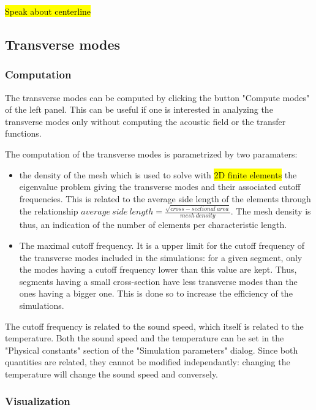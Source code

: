 \documentclass[]{article}
\begin{document}
	\hl{Speak about centerline}
	
	\subsection{Transverse modes}
	
	\subsubsection{Computation}
	
	The transverse modes can be computed by clicking the button
	"Compute modes" of the left panel. This can be useful if one is interested in analyzing the transverse modes only without 
	computing the acoustic field or the transfer functions.
	
	The computation of the transverse modes is parametrized by two 
	paramaters: 
	\begin{itemize}
		\item the density of the mesh which is used to solve with 
		\hl{2D finite elements} the 
		eigenvalue problem giving the transverse modes and their 
		associated cutoff frequencies. This is related to the average
		side length of the elements through the relationship
		$average~side~length = \frac{\sqrt{cross-sectional~area}}{mesh~density}$. 
		The mesh density is thus, an indication of the number of
		elements per characteristic length.
		\item The maximal cutoff frequency. It is a upper limit for the 
		cutoff frequency of the transverse modes included in the 
		simulations: for a given segment, only the modes having a cutoff
		frequency lower than this value are kept. Thus, segments having 
		a small cross-section have less transverse modes than the ones
		having a bigger one. This is done so to increase the efficiency 
		of the simulations.
	\end{itemize}

	The cutoff frequency is related to the sound speed, which itself 
	is related to the temperature. Both the sound speed and the 
	temperature can be set in the "Physical constants" section of 
	the "Simulation parameters" dialog. Since both quantities are
	related, they cannot be modified independantly: changing the 
	temperature will change the sound speed and conversely.

	\subsubsection{Visualization}
	
\end{document}
